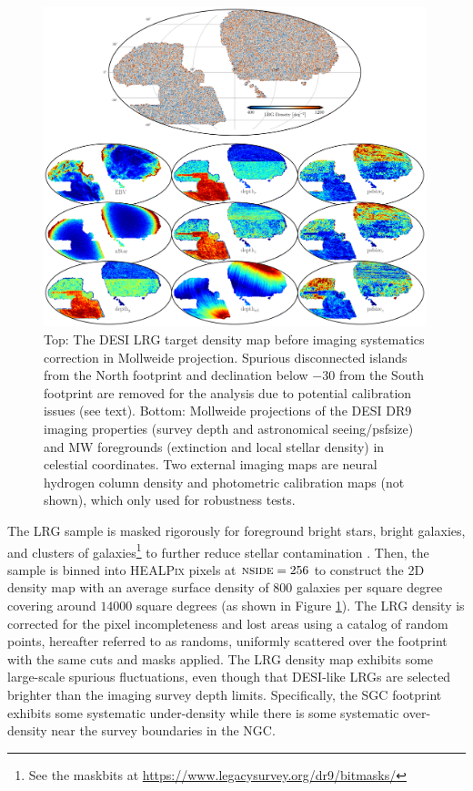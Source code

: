 \begin{figure}
 \centering
 \includegraphics[width=0.99\textwidth]{figures/dr9data.pdf}
 \caption{Top: The DESI LRG target density map before imaging systematics correction in Mollweide projection. Spurious disconnected islands from the North footprint and declination below $-30$ from the South footprint are removed for the analysis due to potential calibration issues (see text). Bottom: Mollweide projections of the DESI DR9 imaging properties (survey depth and astronomical seeing/psfsize) and MW foregrounds (extinction and local stellar density) in celestial coordinates. Two external imaging maps are neural hydrogen column density and photometric calibration maps (not shown), which only used for robustness tests.}
 \label{fig:ng}
\end{figure}

The LRG sample is masked rigorously for foreground bright stars, bright galaxies, and clusters of galaxies\footnote{See the maskbits at \url{https://www.legacysurvey.org/dr9/bitmasks/}} to further reduce stellar contamination \citep{zhou2022target}. Then, the sample is binned into \textsc{HEALPix} \citep{gorski2005healpix} pixels at $\textsc{nside}=256$ to construct the 2D density map with an average surface density of $800$ galaxies per square degree covering around $14000$ square degrees (as shown in Figure \ref{fig:ng}). The LRG density is corrected for the pixel incompleteness and lost areas using a catalog of random points, hereafter referred to as randoms, uniformly scattered over the footprint with the same cuts and masks applied. The LRG density map exhibits some large-scale spurious fluctuations, even though that DESI-like LRGs are selected brighter than the imaging survey depth limits. Specifically, the SGC footprint exhibits some systematic under-density while there is some systematic over-density near the survey boundaries in the NGC.

